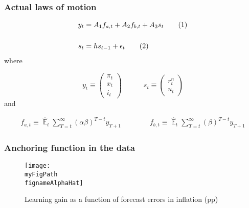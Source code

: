 \documentclass[10pt]{beamer}
\def \myFigPath {../../../figures/}
\newcommand\numberthis{\addtocounter{equation}{1}\tag{\theequation}} %
\DeclareMathOperator{\E}{\mathbb{E}}
\def\mySmallerFigScale{0.18}
\def\fignameAlphaHat{alph_opt_aloneN_500_nfe_5_gridspacing_manual_Wdiffs2_100000_Wmid_1000_Nsimulations_coax_solver_server_11_Sep_2020_15_46_40}
\begin{document}
\begin{frame}[plain]  %
	\frametitle{Actual laws of motion}
	\label{ALMs}

 \begin{align*}
y_t & = A_1 f_{a,t} + A_2 f_{b,t} + A_3 s_t \label{LOM_LR} \numberthis \\
\\
s_t & = h s_{t-1} + \epsilon_t \label{exog} \numberthis
\end{align*}
where

\begin{equation}
 y_t \equiv \begin{pmatrix} \pi_t \\ x_t \\ i_t
 \end{pmatrix} 
 \quad \quad \quad 
  s_t  \equiv \begin{pmatrix} r_t^n \\ u_t 
 \end{pmatrix} 
\end{equation}
and

  \begin{align}
f_{a,t}  \equiv  \hat{\E}_t\sum_{T=t}^{\infty} (\alpha\beta)^{T-t } y_{T+1} \quad \quad \quad \quad 
f_{b,t}  \equiv \hat{\E}_t\sum_{T=t}^{\infty} (\beta)^{T-t } y_{T+1} \label{fafb}
\end{align}

\hyperlink{aggregate_LOMS}{}	


\end{frame}

\begin{frame}
	\frametitle{Anchoring function in the data}\label{estimate}

\begin{figure}[h!]
\texttt{[image: \\myFigPath \\fignameAlphaHat]}
\caption{Learning gain as a function of forecast errors in inflation (pp)}
\label{epi}
\end{figure}

\hyperlink{anchoring1}{}	

\end{frame}
\end{document}
